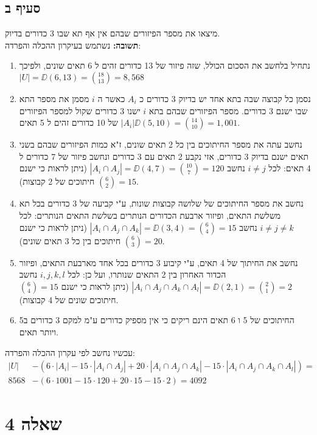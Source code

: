 \documentclass{article}
\begin{document}
	\subsection*{סעיף ב}
	מיצאו את מספר הפיזורים שבהם אין אף תא שבו 3 כדורים בדיוק. \\
	\textbf{תשובה:}
	נשתמש בעיקרון ההכלה והפרדה:
	\begin{enumerate}
		\item נתחיל בלחשב את הסכום הכולל, שזה פיזור של 13 כדורים זהים ל 6 תאים שונים, ולפיכך $|U| = \DD(6, 13) = {18 \choose 13} = 8,568$
		\item נסמן כל קבוצה שבה בתא אחד יש בדיוק 3 כדורים כ $A_i$ כאשר ה $i$ מסמן את מספר התא שבו ישנם 3 כדורים.
		מספר הפיזורים שבהם בתא $i$ ישנו 3 כדורים שקול למספר הפיזורים של 10 כדורים זהים ל 5 תאים $|A_i|\DD(5,10) = {14 \choose 10} = 1,001$.
		\item נחשב עתה את מספר החיתוכים בין כל 2 תאים שונים, ז"א כמות הפיזורים שבהם בשני תאים ישנם בדיוק 3 כדורים, אזי נקבע 2 תאים עם 3 כדורים ונחשב פיזור של 7 כדורים ל 4 תאים:
		לכל $i \neq j$ נחשב $|A_i \cap A_j| = \DD(4,7) = {10 \choose 7} = 120$ (ניתן לראות כי ישנם ${6 \choose 2} = 15$ חיתוכים של 2 קבוצות).
		\item נחשב את מספר החיתוכים של שלושה קבוצות שונות, ע"י קביעה של 3 כדורים בכל תא משלשת התאים, ופיזור ארבעת הכדורים הנותרים בשלשת התאים הנותרים:
		לכל $i \neq j \neq k$ נחשב $|A_i \cap A_j \cap A_k| = \DD(3,4) = {6 \choose 4} = 15$ (ניתן לראות כי ישנם ${6 \choose 3} = 20$ חיתוכים בין כל 3 תאים שונים).
		\item נחשב את החיתוך של 4 תאים, ע"י קיבוע 3 כדורים בכל אחד מארבעת התאים, ופיזור הכדור האחרון בין 2 התאים שנותרו, ועל כן:
		לכל $i,j,k,l$ נחשב $|A_i \cap A_j \cap A_k \cap A_l| = \DD(2,1) = {2 \choose 1} = 2$ (ניתן לראות כי ישנם ${6 \choose 4} = 15$ חיתוכים שונים של 4 קבוצות).
		\item החיתוכים של 5 ו 6 תאים הינם ריקים כי אין מספיק כדורים ע"מ למקם 3 כדורים ב5 ויותר תאים.
	\end{enumerate}
	עכשיו נחשב לפי עקרון ההכלה והפרדה:
	\begin{align*}
	|U| &- (6 \cdot |A_i| - 15 \cdot |A_i \cap A_j| + 20 \cdot |A_i \cap A_j \cap A_k| - 15 \cdot |A_i \cap A_j \cap A_k \cap A_l|) = \\
	8568 &- (6 \cdot 1001 - 15 \cdot 120 + 20 \cdot 15 - 15 \cdot 2) = 4092
	\end{align*}

	\section*{שאלה 4}
\end{document}
